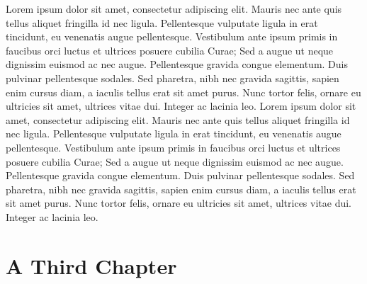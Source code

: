 \documentclass[sans,math-serif,solid,chem,code,notes]{bmc}
\begin{document}
\newpage
Lorem ipsum dolor sit amet, consectetur adipiscing elit. Mauris nec ante quis tellus aliquet fringilla id nec ligula. Pellentesque vulputate ligula in erat tincidunt, eu venenatis augue pellentesque. Vestibulum ante ipsum primis in faucibus orci luctus et ultrices posuere cubilia Curae; Sed a augue ut neque dignissim euismod ac nec augue. Pellentesque gravida congue elementum. Duis pulvinar pellentesque sodales. Sed pharetra, nibh nec gravida sagittis, sapien enim cursus diam, a iaculis tellus erat sit amet purus. Nunc tortor felis, ornare eu ultricies sit amet, ultrices vitae dui. Integer ac lacinia leo.
\newpage
Lorem ipsum dolor sit amet, consectetur adipiscing elit. Mauris nec ante quis tellus aliquet fringilla id nec ligula. Pellentesque vulputate ligula in erat tincidunt, eu venenatis augue pellentesque. Vestibulum ante ipsum primis in faucibus orci luctus et ultrices posuere cubilia Curae; Sed a augue ut neque dignissim euismod ac nec augue. Pellentesque gravida congue elementum. Duis pulvinar pellentesque sodales. Sed pharetra, nibh nec gravida sagittis, sapien enim cursus diam, a iaculis tellus erat sit amet purus. Nunc tortor felis, ornare eu ultricies sit amet, ultrices vitae dui. Integer ac lacinia leo.

\chapter{A Third Chapter}
\end{document}
